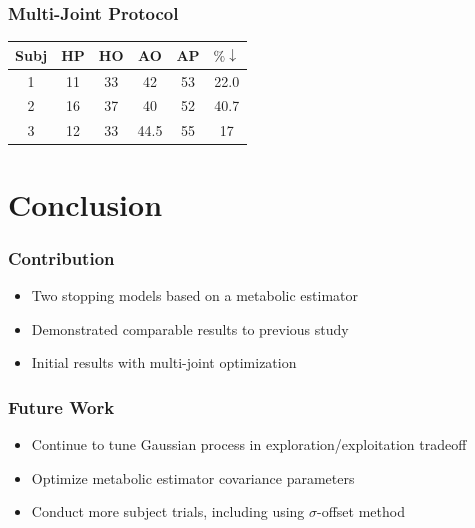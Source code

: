 \documentclass[compress, xcolor=pst]{beamer}
\begin{document}
\begin{frame}
	\frametitle{\textbf{Multi-Joint Protocol}}
	\begin{table}
	\centering
	\begin{tabular}{ |c|c|c|c|c|c| } 
	 \hline
	 Subj & HP & HO & AO & AP &  $\%\downarrow$\\ 
	 \hline
	 1 & 11 & 33 & 42 & 53 & 22.0\\
	 2 & 16 & 37 & 40 & 52 & 40.7\\
	 3 & 12 & 33 & 44.5 & 55 & 17\\
	 \hline
	\end{tabular}
	\end{table}
\end{frame}

\section{Conclusion}
\begin{frame}
	\frametitle{\textbf{Contribution}}
	\begin{itemize}
		\item Two stopping models based on a metabolic estimator
		\item Demonstrated comparable results to previous study
		\item Initial results with multi-joint optimization
	\end{itemize}
\end{frame}

\begin{frame}
	\frametitle{\textbf{Future Work}}
	\begin{itemize}
		\item Continue to tune Gaussian process in exploration/exploitation tradeoff
		\item Optimize metabolic estimator covariance parameters
		\item Conduct more subject trials, including using $\sigma$-offset method
	\end{itemize}
\end{frame}
\end{document}
